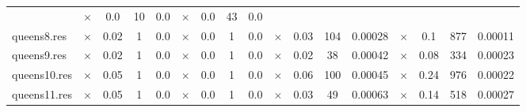 \documentclass[main.tex]{subfiles}
\begin{document}
\begin{landscape}
\begin{center}
\begin{tabular}{|l|cccc|cccc|cccc|cccc|}
 & $\times$ & 0.0 & 10 & 0.0
 & $\times$ & 0.0 & 43 & 0.0
\\
queens8.res & $\times$ & 0.02 & 1 & 0.0
 & $\times$ & 0.0 & 1 & 0.0
 & $\times$ & 0.03 & 104 & 0.00028
 & $\times$ & 0.1 & 877 & 0.00011
\\
queens9.res & $\times$ & 0.02 & 1 & 0.0
 & $\times$ & 0.0 & 1 & 0.0
 & $\times$ & 0.02 & 38 & 0.00042
 & $\times$ & 0.08 & 334 & 0.00023
\\
queens10.res & $\times$ & 0.05 & 1 & 0.0
 & $\times$ & 0.0 & 1 & 0.0
 & $\times$ & 0.06 & 100 & 0.00045
 & $\times$ & 0.24 & 976 & 0.00022
\\
queens11.res & $\times$ & 0.05 & 1 & 0.0
 & $\times$ & 0.0 & 1 & 0.0
 & $\times$ & 0.03 & 49 & 0.00063
 & $\times$ & 0.14 & 518 & 0.00027
\\
\hline\end{tabular}
\end{center}
\end{landscape}
\newpage
\end{document}

